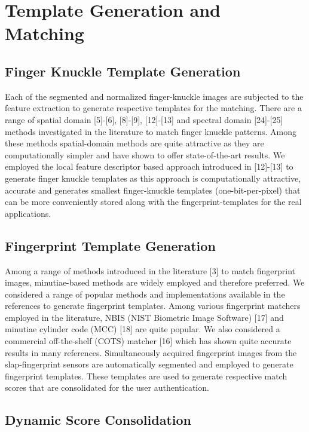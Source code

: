 \section{Template Generation and Matching}

\subsection{Finger Knuckle Template Generation}

Each of the segmented and normalized finger-knuckle images are subjected to the feature extraction to generate respective templates for the matching. There are a range of spatial domain [5]-[6], [8]-[9], [12]-[13] and spectral domain [24]-[25] methods investigated in the literature to match finger knuckle patterns. Among these methods spatial-domain methods are quite attractive as they are computationally simpler and have shown to offer state-of-the-art results.  We employed the local feature descriptor based approach introduced in [12]-[13] to generate finger knuckle templates as this approach is computationally attractive, accurate and generates smallest finger-knuckle templates (one-bit-per-pixel) that can be more conveniently stored along with the fingerprint-templates for the real applications. 

\subsection{Fingerprint Template Generation}

Among a range of methods introduced in the literature [3] to match fingerprint images, minutiae-based methods are widely employed and therefore preferred. We considered a range of popular methods and implementations available in the references to generate fingerprint templates. Among various fingerprint matchers employed in the literature, NBIS (NIST Biometric Image Software) [17] and minutiae cylinder code (MCC) [18] are quite popular. We also considered a commercial off-the-shelf (COTS) matcher [16] which has shown quite accurate results in many references. Simultaneously acquired fingerprint images from the slap-fingerprint sensors are automatically segmented and employed to generate fingerprint templates. These templates are used to generate respective match scores that are consolidated for the user authentication. 

\subsection{Dynamic Score Consolidation}

